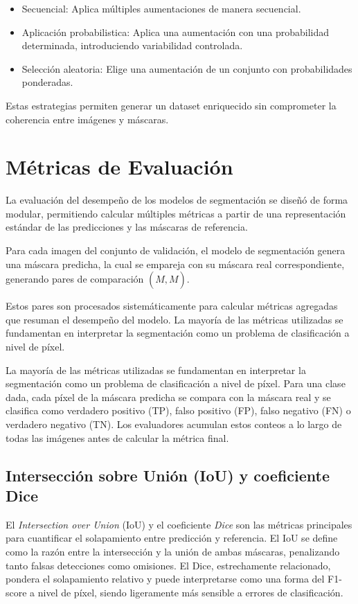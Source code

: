 \documentclass[onecolumn, 12pt , journal]{IEEEtran}
\begin{document}
\begin{itemize}
    \item Secuencial: Aplica múltiples aumentaciones de manera secuencial.
    \item Aplicación probabilistica: Aplica una aumentación con una probabilidad determinada, introduciendo variabilidad controlada.
    \item Selección aleatoria: Elige una aumentación de un conjunto con probabilidades ponderadas.
\end{itemize}

Estas estrategias permiten generar un dataset enriquecido sin comprometer la coherencia entre imágenes y máscaras.

\section{Métricas de Evaluación}
La evaluación del desempeño de los modelos de segmentación se diseñó de forma modular, permitiendo calcular múltiples métricas a partir de una representación estándar de las predicciones y las máscaras de referencia.

Para cada imagen del conjunto de validación, el modelo de segmentación genera una máscara predicha, la cual se empareja con su máscara real correspondiente, generando pares de comparación $(\hat M,M)$.

Estos pares son procesados sistemáticamente para calcular métricas agregadas que resuman el desempeño del modelo. La mayoría de las métricas utilizadas se fundamentan en interpretar la segmentación como un problema de clasificación a nivel de píxel.

La mayoría de las métricas utilizadas se fundamentan en interpretar la segmentación como un problema de clasificación a nivel de píxel. Para una clase dada, cada píxel de la máscara predicha se compara con la máscara real y se clasifica como verdadero positivo (TP), falso positivo (FP), falso negativo (FN) o verdadero negativo (TN). Los evaluadores acumulan estos conteos a lo largo de todas las imágenes antes de calcular la métrica final.

\subsection{Intersección sobre Unión (IoU) y coeficiente Dice}
El \emph{Intersection over Union} (IoU) y el coeficiente \emph{Dice} son las métricas principales para cuantificar el solapamiento entre predicción y referencia.
El IoU se define como la razón entre la intersección y la unión de ambas máscaras, penalizando tanto falsas detecciones como omisiones. El Dice, estrechamente relacionado, pondera el solapamiento relativo y puede interpretarse como una forma del F1-score a nivel de píxel, siendo ligeramente más sensible a errores de clasificación.
\end{document}

